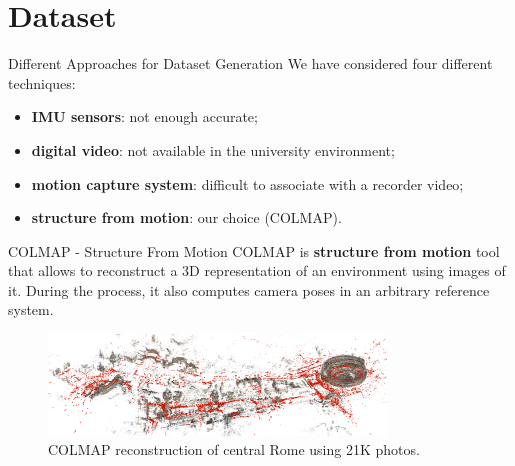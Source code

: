 \documentclass[
    center,
]{beamer}
\begin{document}
\section{Dataset}
\begin{frame}{Different Approaches for Dataset Generation}
    We have considered four different techniques:
    \begin{itemize}
        \item \textbf{IMU sensors}: not enough accurate;
        \item \textbf{digital video}: not available in the university environment;
        \item \textbf{motion capture system}: difficult to associate with a recorder video;
        \item \textbf{structure from motion}: our choice (COLMAP).
    \end{itemize}
\end{frame}
\begin{frame}{COLMAP - Structure From Motion}
    COLMAP is \textbf{structure from motion} tool that allows to reconstruct a 3D representation of an environment using images of it. During the process, it also computes camera poses in an arbitrary reference system.
    \vspace{10px}
    \begin{figure}
        \centering
        \includegraphics[width=0.8\textwidth]{../imgs/colmap_rome.png}
        \caption{COLMAP reconstruction of central Rome using 21K photos.}
    \end{figure}
\end{frame}
\end{document}
